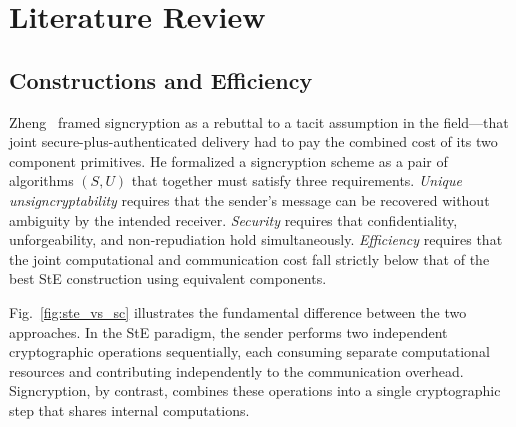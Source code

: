 \documentclass[conference]{IEEEtran}
\begin{document}
\section{Literature Review}

\subsection{Constructions and Efficiency}

Zheng~\cite{zheng1997} framed signcryption as a rebuttal to a tacit assumption in the field---that joint secure-plus-authenticated delivery had to pay the combined cost of its two component primitives. He formalized a signcryption scheme as a pair of algorithms $(S, U)$ that together must satisfy three requirements. \textit{Unique unsigncryptability} requires that the sender's message can be recovered without ambiguity by the intended receiver. \textit{Security} requires that confidentiality, unforgeability, and non-repudiation hold simultaneously. \textit{Efficiency} requires that the joint computational and communication cost fall strictly below that of the best StE construction using equivalent components.

Fig.~\ref{fig:ste_vs_sc} illustrates the fundamental difference between the two approaches. In the StE paradigm, the sender performs two independent cryptographic operations sequentially, each consuming separate computational resources and contributing independently to the communication overhead. Signcryption, by contrast, combines these operations into a single cryptographic step that shares internal computations.
\end{document}
